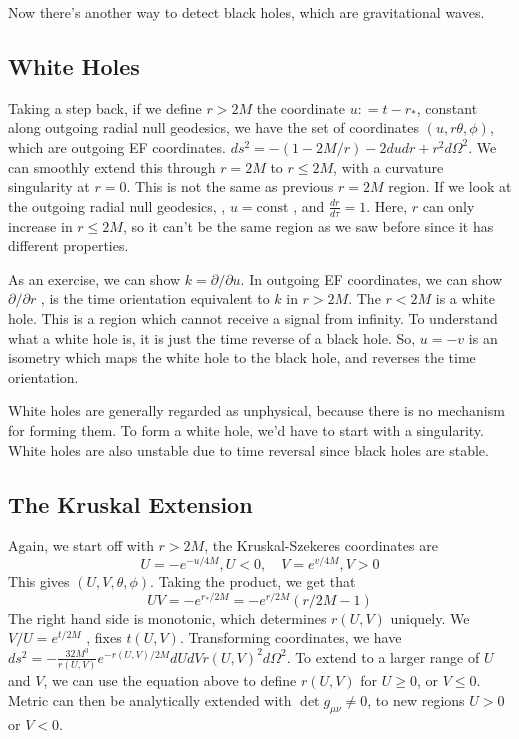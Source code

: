 \documentclass[11pt, oneside]{article}   	%
\theoremstyle{slanted}
\begin{document}
Now there's another way 
to detect black holes, which are gravitational waves. 


\subsection{White Holes}
Taking a step back, if 
we define $ r > 2 M $ the coordinate $ u : = t - r _ * $, 
constant along outgoing radial null geodesics, 
we have the set of coordinates $ \left( u ,r  \theta, \phi  \right)  $, 
which are outgoing EF coordinates. 
$ ds^ 2  =  - \left( 1 - 2M  / r  \right)   - 2 du d r + r ^ 2 d \Omega ^ 2 	  $. 
We can smoothly extend this 
through $ r  = 2 M $ to  $ r \leq 2 M $, 
with a curvature singularity at $ r  = 0$. 
This is not the same as previous $ r  = 2 M $ region. 
If we look at the outgoing radial null geodesics, 
, $ u   = \text{const } $, and $ \frac{dr}{ d \tau }  =  1 $. 
Here, $r  $  can only increase in $ r \leq 2 M $, 
so it can't be the same region as we saw before 
since it has different properties. 

As an exercise, we can show 
$ k  = \partial   / \partial  u $. 
In outgoing EF coordinates, we can show $ \partial   / \partial  r $ , 
is the time orientation equivalent to $ k $ in 
$ r > 2M $.  
The $ r < 2 M $ is a white hole. 
This is a region which cannot receive a 
signal from infinity. 
To understand what a white hole is, 
it is just the time reverse of a black hole. 
So, $ u  = - v $ is an isometry which maps the white 
hole to the black hole, and reverses the time orientation. 

White holes are generally regarded as unphysical, 
because there is no mechanism for 
forming them. 
To form a white hole, we'd 
have to start with a singularity. 
White holes are also unstable due to time reversal 
since black holes are stable. 

\subsection{The Kruskal Extension}
Again, we start off 
with $ r > 2 M $, the Kruskal-Szekeres 
coordinates are 
\[
U  =   - e^{   - u  / 4 M }, U < 0 , \quad V  = e ^{ v / 4 M }, V > 0 
\]  This gives $ \left( U , V , \theta, \phi  \right)  $. 
Taking the product, we get that 
\[
U V  =  - e ^{  r _ *  / 2 M }  =   - e ^{ r / 2 M} \left( r / 2M  - 1  \right)  
\] The right hand side 
is monotonic, 
which determines $ r \left( U , V  \right)  $ uniquely. 
We $ V / U  = e ^{ t / 2 M } $ , fixes $ t \left( U , V  \right)  $. 
Transforming coordinates, we 
have $ ds ^ 2  =  - \frac{32 M ^ 3 }{ r \left( U , V  \right)  } e ^{ 
- r \left( U , V  \right)   / 2 M } d U d V r \left( U , V  \right)  ^ 2 d \Omega^ 2  $. 
To extend 
to a larger range of $ U $ and $ V $, 
we can use the equation above 
to define $ r \left( U , V  \right)  $ for $ U \geq 0 $, 
or $ V \leq 0 $. 
Metric can then be analytically extended with 
$ \det g _{ \mu \nu } \neq   0 $, to new regions $ U > 0 $ or $ V < 0 $. 
\end{document}
